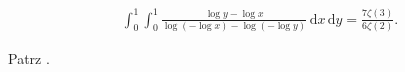 %

\begin{problem_with_solution}
    \label{valean_1_17}%
    \begin{align}
        \int_0^1 \int_0^1 \frac{\log y - \log x}{\log (- \log x) - \log(- \log y)} \,\mathrm{d}x \,\mathrm{d}y = \frac{7 \zeta(3)}{6 \zeta (2)}.
    \end{align} 
\end{problem_with_solution}


\begin{solution}
    Patrz \cite[s. 10]{valean19}.
\end{solution}

%